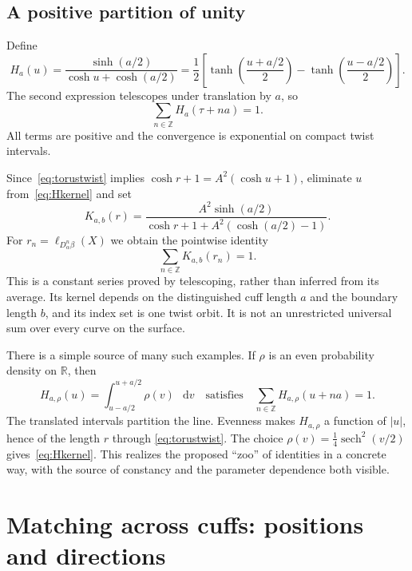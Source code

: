 \documentclass[11pt,a4paper]{article}
\numberwithin{equation}{section}
\theoremstyle{definition}
\theoremstyle{remark}
\DeclareMathOperator{\sech}{sech}
\newcommand{\dd}{\mathop{}\!\mathrm d}
\newcommand{\RR}{\mathbb R}
\newcommand{\ZZ}{\mathbb Z}
\begin{document}
\subsection{A positive partition of unity}

Define
\begin{equation}
 H_a(u)=\frac{\sinh(a/2)}{\cosh u+\cosh(a/2)}
 =\frac12\left[
 \tanh\left(\frac{u+a/2}{2}\right)
 -\tanh\left(\frac{u-a/2}{2}\right)\right].
 \label{eq:Hkernel}
\end{equation}
The second expression telescopes under translation by $a$, so
\begin{equation}
 \sum_{n\in\ZZ}H_a(\tau+na)=1.
 \label{eq:Hidentity}
\end{equation}
All terms are positive and the convergence is exponential on compact
twist intervals.

Since~\eqref{eq:torustwist} implies
$\cosh r+1=A^2(\cosh u+1)$, eliminate $u$ from~\eqref{eq:Hkernel} and set
\begin{equation}
 K_{a,b}(r)=
 \frac{A^2\sinh(a/2)}
      {\cosh r+1+A^2(\cosh(a/2)-1)}.
 \label{eq:Kkernel}
\end{equation}
For $r_n=\ell_{D_\alpha^n\beta}(X)$ we obtain the pointwise identity
\begin{equation}
 \boxed{\sum_{n\in\ZZ}K_{a,b}(r_n)=1.}
 \label{eq:Kidentity}
\end{equation}
This is a constant series proved by telescoping, rather than inferred from
its average. Its kernel depends on the distinguished cuff length $a$ and
the boundary length $b$, and its index set is one twist orbit. It is not
an unrestricted universal sum over every curve on the surface.

There is a simple source of many such examples. If $\rho$ is an even
probability density on $\RR$, then
\[
 H_{a,\rho}(u)=\int_{u-a/2}^{u+a/2}\rho(v)\,\dd v
 \quad\text{satisfies}\quad
 \sum_{n\in\ZZ}H_{a,\rho}(u+na)=1.
\]
The translated intervals partition the line. Evenness makes
$H_{a,\rho}$ a function of $|u|$, hence of the length $r$ through
\eqref{eq:torustwist}. The choice
$\rho(v)=\frac14\sech^2(v/2)$ gives~\eqref{eq:Hkernel}.
This realizes the proposed ``zoo'' of identities in a concrete way, with
the source of constancy and the parameter dependence both visible.

\section{Matching across cuffs: positions and directions}
\label{sec:matching}
\end{document}
